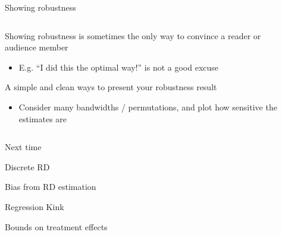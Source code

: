 \documentclass[notes,11pt, aspectratio=169]{beamer}
\newenvironment{wideitemize}{\itemize\addtolength{\itemsep}{10pt}}{\enditemize}
\begin{document}
\begin{frame}{Showing robustness}
    \begin{columns}[onlytextwidth, T] %
      \begin{column}{.5\textwidth}
        \begin{wideitemize}
        \item Showing robustness is sometimes the only way to convince
          a reader or audience member
          \begin{itemize}
          \item E.g. ``I did this the optimal way!'' is not a good excuse
          \end{itemize}
        \item A simple and clean ways to present your robustness result
          \begin{itemize}
          \item Consider many bandwidths / permutations, and plot how sensitive the estimates are            
          \end{itemize}
        \end{wideitemize}
      \end{column}%
      \hfill%
      \begin{column}{.5\textwidth}
                               \end{column}%
    \end{columns}
\end{frame}

\begin{frame}{Next time}
  \begin{wideitemize}
  \item Discrete RD
  \item Bias from RD estimation
  \item Regression Kink
    \item Bounds on treatment effects
  \end{wideitemize}
  
\end{frame}
\end{document}
